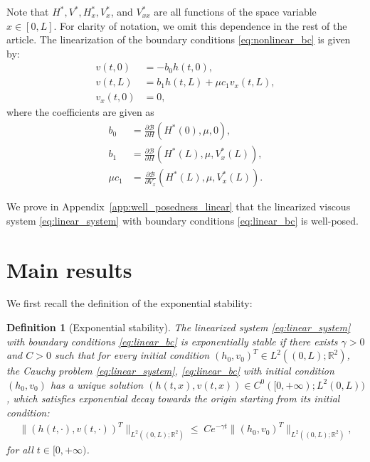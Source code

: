 \documentclass[11pt]{article}
\newtheorem{definition}{Definition}[section]
\begin{document}
{Note that $H^*, V^*, H^*_x, V^*_x$, and $V^*_{xx}$ are all functions of the space variable $x \in [0, L]$. For clarity of notation, we omit this dependence in the rest of the article.} The linearization of the boundary conditions \eqref{eq:nonlinear_bc} is given by:
\begin{equation}
\begin{split}
v(t,0) &= -b_0 h(t,0), \\
v(t,L) &= b_1 h(t,L) + \mu c_1 v_x(t,L), \\
v_x(t,0) &= 0,
\end{split}
\label{eq:linear_bc}
\end{equation}
where the coefficients are given as
\begin{equation}
\begin{split}
b_0 &= \frac{\partial \mathcal B}{\partial H}(H^*(0),\mu,0), \\
b_1 &= \frac{\partial \mathcal B}{\partial H}(H^*(L),\mu,V_x^*(L)), \\
\mu c_1 &= \frac{\partial \mathcal B}{\partial V_x}(H^*(L),\mu,V_x^*(L)).
\end{split}
\end{equation}

{We prove in Appendix~\ref{app:well_posedness_linear} that the linearized viscous system \eqref{eq:linear_system} with boundary conditions \eqref{eq:linear_bc} is well-posed.}

\section{Main results}
\label{sec:results}

We first recall the definition of the exponential stability:

\begin{definition}[Exponential stability]
The linearized system \eqref{eq:linear_system} with boundary conditions \eqref{eq:linear_bc} is exponentially stable 
if there exists $\gamma > 0$ and $C > 0$ such that for every initial condition $(h_0, v_0)^T \in L^2((0, L); \mathbb{R}^2)$, the Cauchy problem \eqref{eq:linear_system}, \eqref{eq:linear_bc} with initial condition $(h_0, v_0)$ has a unique solution $(h(t,x), v(t,x))\in C^{0}([0,+\infty); L^{2}(0,L))$, which satisfies exponential decay towards the origin starting from its initial condition:
\begin{equation}
\begin{split}
    \lVert (h(t, \cdot), v(t, \cdot))^T \rVert_{L^2((0, L) ; \mathbb R^2)} 
    \leq \;  C e^{-\gamma t} \lVert (h_0, v_0)^T \rVert_{L^2((0, L) ; \mathbb R^2)},
\end{split}
\end{equation}
for all $t \in [0, +\infty)$.
\end{definition}
\end{document}
